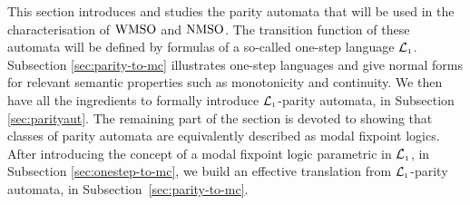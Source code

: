 This section introduces and studies the parity automata that will be used in the characterisation of $\mathrm{WMSO}$ and $\mathrm{NMSO}$. The transition function of these automata will be defined by formulas of a so-called one-step language $\mathcal{L}_{\scriptscriptstyle 1}$. Subsection \ref{sec:parity-to-mc} illustrates one-step languages and give normal forms for relevant semantic properties such as monotonicity and continuity. We then have all the ingredients to formally introduce $\mathcal{L}_{\scriptscriptstyle 1}$-parity automata, in Subsection \ref{sec:parityaut}. The remaining part of the section is devoted to showing that classes of parity automata are equivalently described as modal fixpoint logics. After introducing the concept of a modal fixpoint logic parametric in $\mathcal{L}_{\scriptscriptstyle 1}$, in Subsection \ref{sec:onestep-to-mc}, we build an effective translation from $\mathcal{L}_{\scriptscriptstyle 1}$-parity automata, in Subsection~\ref{sec:parity-to-mc}. 

